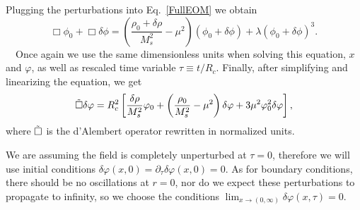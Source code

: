 \documentclass[nofootinbib,twocolumn]{revtex4}
\begin{document}
Plugging the perturbations into Eq.~\eqref{FullEOM} we obtain
\begin{equation}
    \Box\phi_0 + \Box\delta\phi = \left( \frac{\rho_0+\delta\rho}{M_{s}^2}-\mu^2\right)(\phi_0 + \delta\phi)+\lambda(\phi_0 + \delta\phi)^3.
\end{equation}
~~Once again we use the same dimensionless units when solving this equation, $x$ and $\varphi$, as well as rescaled time variable $\tau \equiv t/R_c$. 
Finally, after simplifying and linearizing the equation, we get 
\begin{equation}
    \Tilde{\Box}\delta\varphi = R_c^2\left[\frac{\delta\rho}{M_{s}^2}\varphi_0+\left(\frac{\rho_0}{M_{s}^2}-\mu^2 \right)\delta\varphi+3\mu^2\varphi_0^2\delta\varphi\right],
    \label{FinalEOM}
\end{equation}
where $\Tilde{\Box}$ is the d'Alembert operator rewritten in normalized units.

We are assuming the field is completely unperturbed at $\tau=0$, therefore we will use initial conditions $\delta \varphi (x,0) = \partial_{\tau}\delta \varphi (x,0) = 0$. As for boundary conditions, there should be no oscillations at $r=0$, nor do we expect these perturbations to propagate to infinity, so we choose the conditions $\lim_{x \to (0 , \infty)} \delta \varphi(x,\tau) = 0$.
\end{document}

